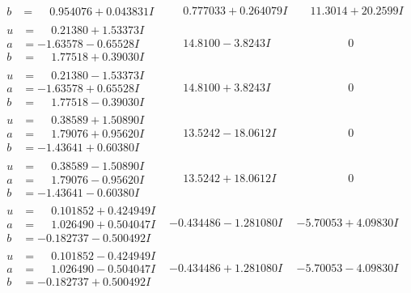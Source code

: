 \documentclass[1p]{elsarticle_modified}
\theoremstyle{definition}
\begin{document}
$$\begin{array}{c|c|c}
\begin{aligned}
b &= \phantom{-}0.954076 + 0.043831 I\end{aligned}
 & \phantom{-}0.777033 + 0.264079 I & \phantom{-}11.3014 + 20.2599 I \\ \hline\begin{aligned}
u &= \phantom{-}0.21380 + 1.53373 I \\
a &= -1.63578 - 0.65528 I \\
b &= \phantom{-}1.77518 + 0.39030 I\end{aligned}
 & \phantom{-}14.8100 - 3.8243 I & \phantom{-0.000000 } 0 \\ \hline\begin{aligned}
u &= \phantom{-}0.21380 - 1.53373 I \\
a &= -1.63578 + 0.65528 I \\
b &= \phantom{-}1.77518 - 0.39030 I\end{aligned}
 & \phantom{-}14.8100 + 3.8243 I & \phantom{-0.000000 } 0 \\ \hline\begin{aligned}
u &= \phantom{-}0.38589 + 1.50890 I \\
a &= \phantom{-}1.79076 + 0.95620 I \\
b &= -1.43641 + 0.60380 I\end{aligned}
 & \phantom{-}13.5242 - 18.0612 I & \phantom{-0.000000 } 0 \\ \hline\begin{aligned}
u &= \phantom{-}0.38589 - 1.50890 I \\
a &= \phantom{-}1.79076 - 0.95620 I \\
b &= -1.43641 - 0.60380 I\end{aligned}
 & \phantom{-}13.5242 + 18.0612 I & \phantom{-0.000000 } 0 \\ \hline\begin{aligned}
u &= \phantom{-}0.101852 + 0.424949 I \\
a &= \phantom{-}1.026490 + 0.504047 I \\
b &= -0.182737 - 0.500492 I\end{aligned}
 & -0.434486 - 1.281080 I & -5.70053 + 4.09830 I \\ \hline\begin{aligned}
u &= \phantom{-}0.101852 - 0.424949 I \\
a &= \phantom{-}1.026490 - 0.504047 I \\
b &= -0.182737 + 0.500492 I\end{aligned}
 & -0.434486 + 1.281080 I & -5.70053 - 4.09830 I \\ \hline\begin{aligned}

\end{aligned}
\end{array}$$
\end{document}
